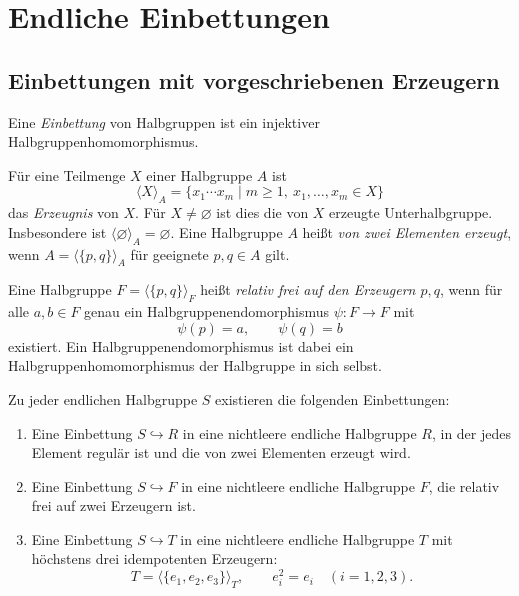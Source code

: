 \chapter{Endliche Einbettungen}
\label{chap:b37-guide-representations}

\section{Einbettungen mit vorgeschriebenen Erzeugern}

\begin{definition}
\label{def:b37-guide-generators}
Eine \emph{Einbettung} von Halbgruppen ist ein injektiver
Halbgruppenhomomorphismus.

Für eine Teilmenge $X$ einer Halbgruppe $A$ ist
\[
 \langle X\rangle_A
 =\{x_1\cdots x_m\mid m\geq1,\ x_1,\ldots,x_m\in X\}
\]
das \emph{Erzeugnis} von $X$. Für $X\ne\varnothing$ ist dies die von
$X$ erzeugte Unterhalbgruppe. Insbesondere ist
$\langle\varnothing\rangle_A=\varnothing$.
Eine Halbgruppe $A$ heißt \emph{von zwei Elementen erzeugt}, wenn
$A=\langle\{p,q\}\rangle_A$ für geeignete $p,q\in A$ gilt.
\end{definition}

\begin{definition}
\label{def:b37-guide-relative-free}
Eine Halbgruppe $F=\langle\{p,q\}\rangle_F$ heißt
\emph{relativ frei auf den Erzeugern $p,q$}, wenn für alle $a,b\in F$
genau ein Halbgruppenendomorphismus $\psi:F\to F$ mit
\[
 \psi(p)=a,\qquad \psi(q)=b
\]
existiert. Ein Halbgruppenendomorphismus ist dabei ein
Halbgruppenhomomorphismus der Halbgruppe in sich selbst.
\end{definition}

\begin{theorem}
\label{thm:b37-guide-finite-embeddings}
Zu jeder endlichen Halbgruppe $S$ existieren die folgenden Einbettungen:
\begin{enumerate}
 \item Eine Einbettung $S\hookrightarrow R$ in eine nichtleere endliche
 Halbgruppe $R$, in der jedes Element regulär ist und die von zwei
 Elementen erzeugt wird. \cite{Higgins2017}
 \item Eine Einbettung $S\hookrightarrow F$ in eine nichtleere endliche
 Halbgruppe $F$, die relativ frei auf zwei Erzeugern
 ist. \cite{Bergman2004}
 \item Eine Einbettung $S\hookrightarrow T$ in eine nichtleere endliche
 Halbgruppe $T$ mit höchstens drei idempotenten Erzeugern:
 \[
 T=\langle\{e_1,e_2,e_3\}\rangle_T,
 \qquad e_i^2=e_i\quad(i=1,2,3).
 \]
 \cite[S.~62]{Higgins2017}
\end{enumerate}
\end{theorem}
